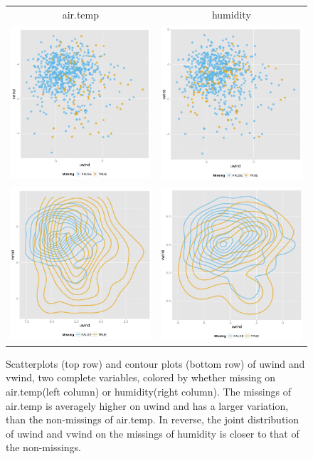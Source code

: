 \documentclass[article]{jss}
\begin{document}
\begin{center}
\begin{figure}[h]
\begin{centering}
\begin{tabular}{cc}
{\tiny{air.temp}} & {\tiny{humidity}}\tabularnewline
\includegraphics[width=.32\textwidth]{graph/fig11-1-air-temp} & \includegraphics[width=.32\textwidth]{graph/fig11-3-humidity}\tabularnewline
\includegraphics[width=.32\textwidth]{graph/fig11-2-air-temp} & \includegraphics[width=.32\textwidth]{graph/fig11-4-humidity}\tabularnewline
\end{tabular}
\par\end{centering}
\caption{Scatterplots (top row) and contour plots (bottom row) of uwind and vwind, two complete variables, colored by whether missing on air.temp(left column) or humidity(right column). The missings of air.temp is averagely higher on uwind and has a larger variation, than the non-missings of air.temp. In reverse, the joint distribution of uwind and vwind on the missings of humidity is closer to that of the non-missings.}
\label{fig:uvwind}
\end{figure}
\par\end{center}
\end{document}
